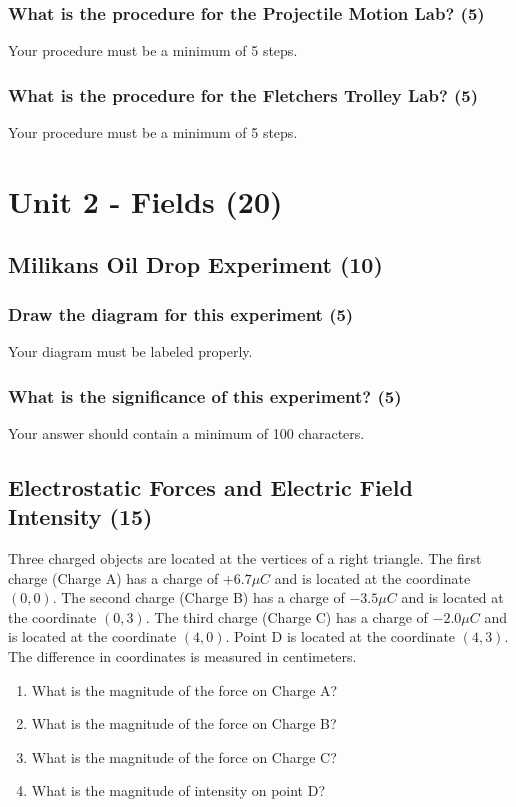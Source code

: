 \documentclass{article}
\begin{document}
\subsubsection{What is the procedure for the Projectile Motion Lab? (5)}
Your procedure must be a minimum of 5 steps.

\subsubsection{What is the procedure for the Fletchers Trolley Lab? (5)}
Your procedure must be a minimum of 5 steps.

\section{Unit 2 - Fields (20)}
\subsection{Milikans Oil Drop Experiment (10)}
\subsubsection{Draw the diagram for this experiment (5)}
Your diagram must be labeled properly.

\subsubsection{What is the significance of this experiment? (5)}
Your answer should contain a minimum of 100 characters.

\subsection{Electrostatic Forces and Electric Field Intensity (15)}
Three charged objects are located at the vertices of a right triangle. The first charge (Charge A) has a charge of $+6.7\mu C$ and is located at the coordinate $(0, 0)$. The second charge (Charge B) has a charge of $-3.5\mu C$ and is located at the coordinate $(0, 3)$. The third charge (Charge C) has a charge of $-2.0\mu C$ and is located at the coordinate $(4, 0)$. Point D is located at the coordinate $(4, 3)$. The difference in coordinates is measured in centimeters.
\begin{enumerate}[label=\alph*)]
    \item What is the magnitude of the force on Charge A?
    \item What is the magnitude of the force on Charge B?
    \item What is the magnitude of the force on Charge C?
    \item What is the magnitude of intensity on point D?
\end{enumerate}
\end{document}
